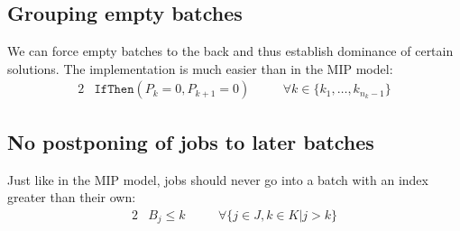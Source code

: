 \begin{comment}
\subsection{Temporal constraints on a job's start date} Given any partial
assignment of jobs and an open job $j$, we can reason that \begin{alist}
\item{if the first batch with a due date later than the job is $k$, then the job
cannot be part of a batch after $k$ -- this would result in a non-EDD sequence
of batches.} \item{if the first batches up to $k-1$ offer not enough capacity
for $j$ due to the given partial assignment, then the job cannot be part of a
batch before $k$.} \end{alist} Since batches are \textit{not} dynamically
created like in Malapert's solution but fixed from the start, any partial
assignment that fails due to these constraints cannot be part of an optimal
solution.

This constraint is redundant with both the $(C_{k+1}\geq C_k)$ and
\texttt{packing} constraints, but may help accelerate the propagation in some
cases.
\end{comment}

\subsection{Grouping empty batches} We can force
empty batches to the back and thus establish dominance of certain solutions. The
implementation is much easier than in the MIP model: 
\begin{alignat}{2} &
\mathtt{IfThen}( P_k = 0, P_{k+1} = 0 ) \quad && \forall k \in
\{k_1, \dots, k_{n_k-1}\}
\end{alignat}

\subsection{No postponing of jobs to later batches} Just like in the MIP model,
jobs should never go into a batch with an index greater than their own:
\begin{alignat}{2}
& B_j \leq k \quad && \forall \{j \in J, k \in K | j > k \}
\end{alignat}



